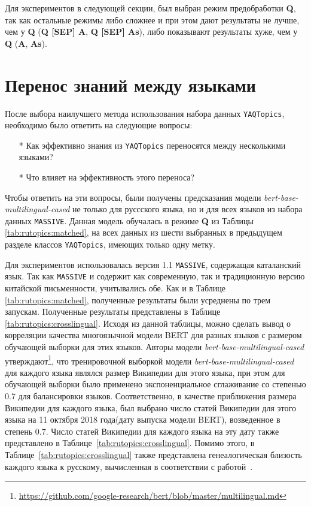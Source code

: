 Для экспериментов в следующей секции, был выбран режим предобработки \textbf{Q}, так как остальные режимы либо сложнее и при этом дают результаты не лучше, чем у \textbf{Q} (\textbf{Q [SEP] A}, \textbf{Q [SEP] As}), либо показывают результаты хуже, чем у \textbf{Q} (\textbf{A}, \textbf{As}).





\section{Перенос знаний между языками}
После выбора наилучшего метода использования набора данных \texttt{YAQTopics}, необходимо было ответить на следующие вопросы:
\begin{itemize}
\item[*]Как эффективно знания из \texttt{YAQTopics} переносятся между несколькими языками?
\item[*]Что влияет на эффективность этого переноса?
\end{itemize}
Чтобы ответить на эти вопросы, были получены предсказания модели \textit{bert-base-multilingual-cased} не только для руссского языка, но и для всех языков из набора данных \texttt{MASSIVE}. Данная модель обучалась в режиме \textbf{Q} из Таблицы \ref{tab:rutopics:matched}, на всех данных из шести выбранных в предыдущем разделе классов \texttt{YAQTopics}, имеющих только одну метку. 

Для экспериментов использовалась версия 1.1 \texttt{MASSIVE}, содержащая каталанский язык. Так как \texttt{MASSIVE} и содержит как современную, так и традиционную версию китайской письменности, учитывались обе. Как и в Таблице \ref{tab:rutopics:matched}, полученные результаты были усреднены по трем запускам.
Полученные результаты представлены в Таблице \ref{tab:rutopics:crosslingual}. Исходя из данной таблицы, можно сделать вывод о корреляции качества многоязычной модели BERT для разных языков с размером обучающей выборки для этих языков. Авторы модели \textit{bert-base-multilingual-cased} утверждают\footnote{\url{https://github.com/google-research/bert/blob/master/multilingual.md}}, что тренировочной выборкой модели \textit{bert-base-multilingual-cased} для каждого языка являлся размер Википедии для этого языка, при этом для обучающей выборки было применено экспоненциальное сглаживание со степенью 0.7 для балансировки языков.
Соответственно, в качестве приближения размера Википедии для каждого языка, был выбрано число статей Википедии для этого языка на 11 октября 2018 года(дату выпуска модели BERT), возведенное в степень 0.7.  Число статей Википедии для каждого языка на эту дату также представлено в Таблице~\ref{tab:rutopics:crosslingual}. Помимо этого, в Таблице~\ref{tab:rutopics:crosslingual} также представлена генеалогическая близость каждого языка к русскому, вычисленная в соответствии с работой~\cite{lang_sim}. 

